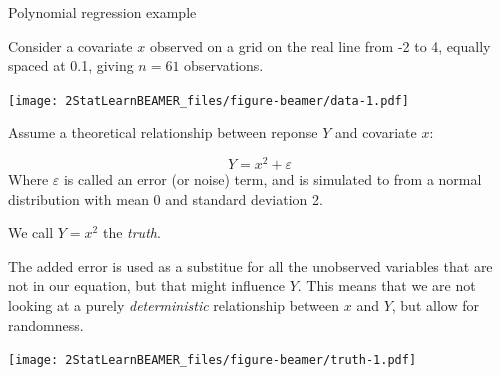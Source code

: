 \documentclass[ignorenonframetext,]{beamer}
\begin{document}
\begin{frame}

\begin{block}{Polynomial regression example}

Consider a covariate \(x\) observed on a grid on the real line from -2
to 4, equally spaced at 0.1, giving \(n=61\) observations.

\texttt{[image: 2StatLearnBEAMER\_files/figure-beamer/data-1.pdf]}

\end{block}

\end{frame}

\begin{frame}

Assume a theoretical relationship between reponse \(Y\) and covariate
\(x\):

\[ Y=x^2 + \varepsilon\] Where \(\varepsilon\) is called an error (or
noise) term, and is simulated to from a normal distribution with mean 0
and standard deviation 2.

We call \(Y=x^2\) the \emph{truth}.

The added error is used as a substitue for all the unobserved variables
that are not in our equation, but that might influence \(Y\). This means
that we are not looking at a purely \emph{deterministic} relationship
between \(x\) and \(Y\), but allow for randomness.

\end{frame}

\begin{frame}

\texttt{[image: 2StatLearnBEAMER\_files/figure-beamer/truth-1.pdf]}

\end{frame}
\end{document}
